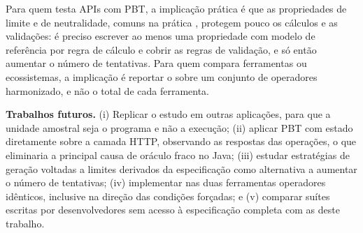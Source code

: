 Para quem testa APIs com PBT, a implicação prática é que as propriedades de limite e de neutralidade, comuns na prática \citep{corgozinho2023pbt}, protegem pouco os cálculos e as validações: é preciso escrever ao menos uma propriedade com modelo de referência por regra de cálculo e cobrir as regras de validação, e só então aumentar o número de tentativas. Para quem compara ferramentas ou ecossistemas, a implicação é reportar o \ms{} sobre um conjunto de operadores harmonizado, e não o total de cada ferramenta.

\textbf{Trabalhos futuros.} (i) Replicar o estudo em outras aplicações, para que a unidade amostral seja o programa e não a execução; (ii) aplicar PBT com estado diretamente sobre a camada HTTP, observando as respostas das operações, o que eliminaria a principal causa de oráculo fraco no Java; (iii) estudar estratégias de geração voltadas a limites derivados da especificação como alternativa a aumentar o número de tentativas; (iv) implementar nas duas ferramentas operadores idênticos, inclusive na direção das condições forçadas; e (v) comparar suítes escritas por desenvolvedores sem acesso à especificação completa com as deste trabalho.
